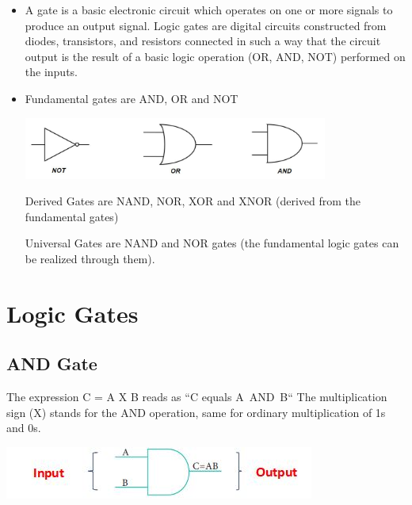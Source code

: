 \documentclass[10pt,a4paper,onecolumn]{article}
\begin{document}
\begin{itemize}
		\item A gate is a basic electronic circuit which operates on one or more signals to produce an output signal. 
		Logic gates are digital circuits constructed from diodes, transistors, and resistors connected in such a way that the circuit output is the result of a basic logic operation (OR, AND, NOT) performed on the inputs. \\
		
		\item Fundamental gates are \color{red}AND, OR \color{black}and \color{red}NOT \\
		\begin{center}\includegraphics[width=10cm]{gst3.jpg}\end{center}
		
		\color{black}Derived Gates are \color{red}NAND, NOR, XOR \color{black}and \color{red}XNOR \color{black}(derived from the fundamental gates)
		
		Universal Gates are \color{red}NAND \color{black} and \color{red}NOR \color{black}gates (the fundamental logic gates can be realized through them).
		
		
	\end{itemize}
\section{Logic Gates}

\subsection{AND Gate}
The expression C = A X B reads as “C equals A AND B“ 
The multiplication sign (X) stands for the AND operation, same for ordinary multiplication of 1s and 0s.\\
\begin{center}\includegraphics{gst4}\end{center}
\end{document}
